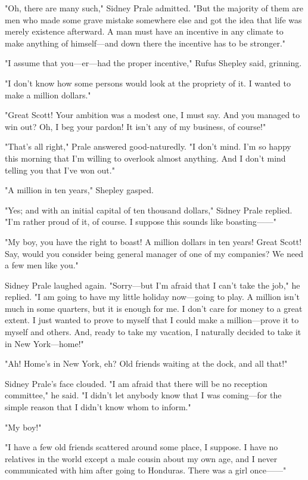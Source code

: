 \documentclass{novel}
\begin{document}
"Oh, there are many such," Sidney Prale admitted. "But the majority of them are men who made some grave mistake somewhere else and got the idea that life was merely existence afterward. A man must have an incentive in any climate to make anything of himself---and down there the incentive has to be stronger."

"I assume that you---er---had the proper incentive," Rufus Shepley said, grinning.

"I don't know how some persons would look at the propriety of it. I wanted to make a million dollars."

"Great Scott! Your ambition was a modest one, I must say. And you managed to win out? Oh, I beg your pardon! It isn't any of my business, of course!"

"That's all right," Prale answered good-naturedly. "I don't mind. I'm so happy this morning that I'm willing to overlook almost anything. And I don't mind telling you that I've won out."

"A million in ten years," Shepley gasped.

"Yes; and with an initial capital of ten thousand dollars," Sidney Prale replied. "I'm rather proud of it, of course. I suppose this sounds like boasting------"

"My boy, you have the right to boast! A million dollars in ten years! Great Scott! Say, would you consider being general manager of one of my companies? We need a few men like you."

Sidney Prale laughed again. "Sorry---but I'm afraid that I can't take the job," he replied. "I am going to have my little holiday now---going to play. A million isn't much in some quarters, but it is enough for me. I don't care for money to a great extent. I just wanted to prove to myself that I could make a million---prove it to myself and others. And, ready to take my vacation, I naturally decided to take it in New York---home!"

"Ah! Home's in New York, eh? Old friends waiting at the dock, and all that!"

Sidney Prale's face clouded. "I am afraid that there will be no reception committee," he said. "I didn't let anybody know that I was coming---for the simple reason that I didn't know whom to inform."

"My boy!"

"I have a few old friends scattered around some place, I suppose. I have no relatives in the world except a male cousin about my own age, and I never communicated with him after going to Honduras. There was a girl once------"
\end{document}
